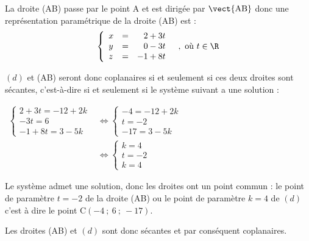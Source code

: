 La droite (AB) passe par le point A et  est dirigée par $\vect{\mathrm{AB}}$ donc une représentation paramétrique de la droite (AB) est :
\[\left\{\begin{array}{lcl}
x&=&\phantom{-}2 +3t\\
y&=&\phantom{-}0 -3 t\\
z&=&-1+8t
\end{array} \quad, \text { où } t \in \R\right.\]

$(d)$ et (AB) seront donc coplanaires si et seulement si ces deux droites sont sécantes, c'est-à-dire si et seulement si le système suivant a une solution :

$\begin{aligned}
	\left\{\begin{array}{l}
		2+3t=-12+2k\\
		-3t=6 \\
		-1+8t=3-5k
	\end{array}\right.
	&\iff
	\left\{\begin{array}{l}
		-4=-12+2k \\
		t=-2\\
		-17=3-5k
	\end{array}\right.\\
	&\iff
	\left\{\begin{array}{l}
		k=4 \\
		t=-2\\
		k=4
	\end{array}\right.
\end{aligned}$

Le système admet une solution, donc les droites ont un point commun : le point de paramètre $t=-2$ de la droite (AB) ou le point de paramètre $k=4$ de $(d)$ c'est à dire le point C$(-4~;~6~;~-17)$.

Les droites (AB) et $(d)$  sont donc sécantes et par conséquent coplanaires.

\bigskip

